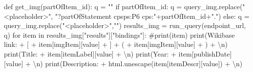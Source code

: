 \documentclass[
  letterpaper,
]{book}
\newenvironment{Shaded}{\begin{snugshade}}{\end{snugshade}}
\newcommand{\BuiltInTok}[1]{\textcolor[rgb]{0.00,0.23,0.31}{#1}}
\newcommand{\CharTok}[1]{\textcolor[rgb]{0.13,0.47,0.30}{#1}}
\newcommand{\CommentTok}[1]{\textcolor[rgb]{0.37,0.37,0.37}{#1}}
\newcommand{\ControlFlowTok}[1]{\textcolor[rgb]{0.00,0.23,0.31}{#1}}
\newcommand{\KeywordTok}[1]{\textcolor[rgb]{0.00,0.23,0.31}{#1}}
\newcommand{\NormalTok}[1]{\textcolor[rgb]{0.00,0.23,0.31}{#1}}
\newcommand{\OperatorTok}[1]{\textcolor[rgb]{0.37,0.37,0.37}{#1}}
\newcommand{\StringTok}[1]{\textcolor[rgb]{0.13,0.47,0.30}{#1}}
\begin{document}
\begin{Shaded}
\begin{Highlighting}[]
\KeywordTok{def}\NormalTok{ get\_img(partOfItem\_id):}
\NormalTok{    q }\OperatorTok{=} \StringTok{""}
    \ControlFlowTok{if}\NormalTok{ partOfItem\_id:}
\NormalTok{        q }\OperatorTok{=}\NormalTok{ query\_img.replace(}\StringTok{"\textless{}placeholder\textgreater{}"}\NormalTok{, }\StringTok{"?partOfStatement cpsps:P6 cps:"}\OperatorTok{+}\NormalTok{partOfItem\_id}\OperatorTok{+}\StringTok{"."}\NormalTok{)}
    \ControlFlowTok{else}\NormalTok{:}
\NormalTok{        q }\OperatorTok{=}\NormalTok{ query\_img.replace(}\StringTok{"\textless{}placeholder\textgreater{}"}\NormalTok{,}\StringTok{""}\NormalTok{)}
\NormalTok{    results\_img }\OperatorTok{=}\NormalTok{ run\_query(endpoint\_url, q)}
    \ControlFlowTok{for}\NormalTok{ item }\KeywordTok{in}\NormalTok{ results\_img[}\StringTok{"results"}\NormalTok{][}\StringTok{"bindings"}\NormalTok{]:    }
      \CommentTok{\#print(item)}
      \BuiltInTok{print}\NormalTok{(}\StringTok{\textquotesingle{}Wikibase link: \textquotesingle{}} \OperatorTok{+} \StringTok{\textquotesingle{}[\textquotesingle{}} \OperatorTok{+}\NormalTok{ item[}\StringTok{\textquotesingle{}imgItem\textquotesingle{}}\NormalTok{][}\StringTok{\textquotesingle{}value\textquotesingle{}}\NormalTok{] }\OperatorTok{+} \StringTok{\textquotesingle{}]\textquotesingle{}} \OperatorTok{+} \StringTok{\textquotesingle{}(\textquotesingle{}} \OperatorTok{+}\NormalTok{ item[}\StringTok{\textquotesingle{}imgItem\textquotesingle{}}\NormalTok{][}\StringTok{\textquotesingle{}value\textquotesingle{}}\NormalTok{] }\OperatorTok{+} \StringTok{\textquotesingle{})\textquotesingle{}} \OperatorTok{+} \StringTok{\textquotesingle{}}\CharTok{\textbackslash{}n}\StringTok{\textquotesingle{}}\NormalTok{)}
      \BuiltInTok{print}\NormalTok{(}\StringTok{\textquotesingle{}Title: \textquotesingle{}} \OperatorTok{+}\NormalTok{ item[}\StringTok{\textquotesingle{}itemLabel\textquotesingle{}}\NormalTok{][}\StringTok{\textquotesingle{}value\textquotesingle{}}\NormalTok{] }\OperatorTok{+} \StringTok{\textquotesingle{}}\CharTok{\textbackslash{}n}\StringTok{\textquotesingle{}}\NormalTok{)}
      \BuiltInTok{print}\NormalTok{(}\StringTok{\textquotesingle{}Year: \textquotesingle{}} \OperatorTok{+}\NormalTok{ item[}\StringTok{\textquotesingle{}publishDate\textquotesingle{}}\NormalTok{][}\StringTok{\textquotesingle{}value\textquotesingle{}}\NormalTok{] }\OperatorTok{+} \StringTok{\textquotesingle{}}\CharTok{\textbackslash{}n}\StringTok{\textquotesingle{}}\NormalTok{)}
      \BuiltInTok{print}\NormalTok{(}\StringTok{\textquotesingle{}Description: \textquotesingle{}} \OperatorTok{+}\NormalTok{ html.unescape(item[}\StringTok{\textquotesingle{}itemDescr\textquotesingle{}}\NormalTok{][}\StringTok{\textquotesingle{}value\textquotesingle{}}\NormalTok{]) }\OperatorTok{+} \StringTok{\textquotesingle{}}\CharTok{\textbackslash{}n}\StringTok{\textquotesingle{}}\NormalTok{)}


\end{Highlighting}
\end{Shaded}
\end{document}
